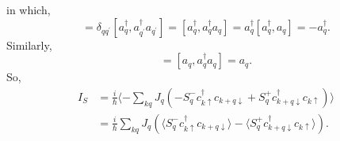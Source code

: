 \documentclass[11pt,a4paper]{article}
\begin{document}
in which,
\begin{equation}
[a_{q}^{\dag}, \sum_{q^{\prime}} a_{q'}^{\dagger}, a_{q^{\prime}}] = \delta_{q q^{\prime}}[a_{q}^{\dagger}, a_{q^{\prime}}^{\dagger} a_{q^{\prime}}] = [a_{q}^{\dagger}, a_{q}^{\dagger} a_{q}] = a_{q}^{\dagger}[a_{q}^{\dagger}, a_{q}] = - a_{q}^{\dagger}.
\end{equation}
Similarly,
\begin{equation}
[a_{q}, \sum_{q^{\prime}} a_{q^{\prime}}^{+} a_{q^{\prime}}]=[a_{q}, a_{q}^{\dagger} a_{q}]=a_{q}.
\label{eq:1-1}
\end{equation}
So,
\begin{equation}
\begin{split}
I_{S}&=\frac{i}{\hbar}\langle -\sum_{k q} J_{q}\left(-S_{q}^{-} c_{k \uparrow}^{\dagger} c_{k+q\downarrow} + S_{q}^{+} c_{k+q\downarrow}^{\dagger} c_{k \uparrow}\right) \rangle \\
&= \frac{i}{\hbar} \sum_{k q} J_{q}\left( \langle S_{q}^{-} c_{k \uparrow}^{\dagger} c_{k+q\downarrow}\rangle - \langle S_{q}^{+} c_{k+q\downarrow}^{\dagger} c_{k \uparrow}\rangle \right).
\end{split}
\end{equation}
\end{document}
